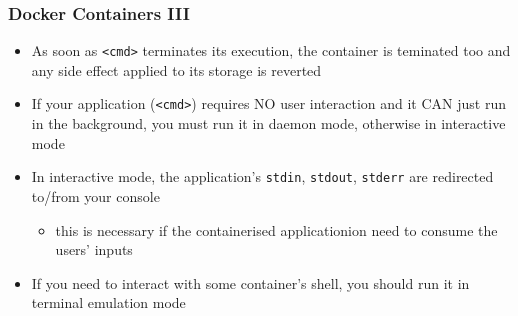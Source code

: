 \documentclass[handout]{beamer}\mode<presentation>{\usetheme{AMSCesenaBleu}}
\begin{document}
\begin{frame}
\frametitle{Docker Containers III}
    \begin{itemize}
        
        \item As soon as \texttt{<cmd>} terminates its execution, the container is teminated too and any side effect applied to its storage is reverted
        
        \pause
        
        \item If your application (\texttt{<cmd>}) requires NO user interaction and it CAN just run in the background, you must run it in daemon mode, otherwise in interactive mode
        
        \pause
        
        \item In interactive mode, the application's \texttt{stdin}, \texttt{stdout}, \texttt{stderr} are redirected to/from your console
        \begin{itemize}
            \item this is necessary if the containerised applicationion need to consume the users' inputs
        \end{itemize}
        
        \pause
        
        \item If you need to interact with some container's shell, you should run it in terminal emulation mode
    \end{itemize}

\end{frame}
\end{document}

